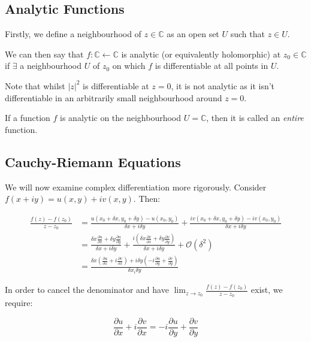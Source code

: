 \documentclass{physics_notes}
\begin{document}
\subsection{Analytic Functions}
Firstly, we define a neighbourhood of $z\in \mathbb{C}$ as an open set $U$ such that $z \in U$.

We can then say that $f: \mathbb{C} \leftarrow \mathbb{C}$ is analytic (or equivalently holomorphic) at $z_0 \in \mathbb{C}$ if $\exists$ a neighbourhood $U$ of $z_0$ on which $f$ is differentiable at all points in $U$.

Note that whilst $|z|^2$ is differentiable at $z = 0$, it is not analytic as it isn't differentiable in an arbitrarily small neighbourhood around $z=0$.

If a function $f$ is analytic on the neighbourhood $U = \mathbb{C}$, then it is called an \emph{entire} function.

\subsection{Cauchy-Riemann Equations }
We will now examine complex differentiation more rigorously. Consider $f(x + iy) = u(x,y) + iv(x,y)$. Then:

\begin{align*}
\frac{f(z) - f(z_0)}{z-z_0} &= \frac{u(x_0 + \delta x, y_0 + \delta y) -u(x_0, y_0)}{\delta x + i\delta y} + \frac{iv(x_0 + \delta x, y_0 + \delta y) - iv(x_0,y_0)}{\delta x + i\delta y} \\
&= \frac{\delta x \frac{\partial u}{\partial x} + \delta y \frac{\partial u}{\partial y}}{\delta x + i\delta y} + \frac{i \left(\delta x \frac{\partial v}{\partial x} + \delta y \frac{\partial v}{\partial y} \right)}{\delta x + i\delta y} + \mathcal{O}(\delta^2) \\
&= \frac{\delta x \left(\frac{\partial u}{\partial x} + i\frac{\partial v}{\partial x}\right) + i\delta y \left(-i\frac{\partial u}{\partial y} + \frac{\partial v}{\partial y}\right)}{\delta x _ i\delta y}
\end{align*}

In order to cancel the denominator and have $\lim_{z\to z_0} \frac{f(z) - f(z_0)}{z-z_0}$ exist, we require:

\[ \frac{\partial u}{\partial x} + i\frac{\partial v}{\partial x} = -i\frac{\partial u}{\partial y} + \frac{\partial v}{\partial y} \]
\end{document}
